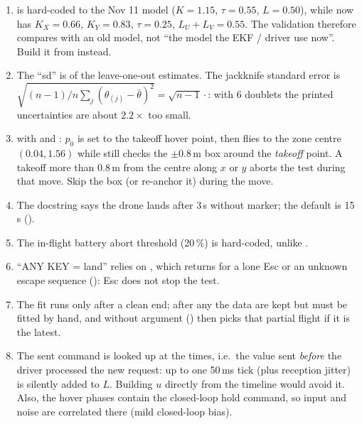 \begin{review}
\begin{enumerate}[leftmargin=*,itemsep=2pt]
\item {}  is hard-coded to the Nov 11 model ($K=1.15$, $\tau=0.55$,
$L=0.50$), while  now has $K_X=0.66$, $K_Y=0.83$, $\tau=0.25$, $L_U+L_V=0.55$. The
validation therefore compares with an old model, not ``the model the EKF / driver use now''. Build it from
 instead.
\item {} The ``sd'' is  of the leave-one-out estimates. The jackknife
standard error is $\sqrt{(n-1)/n\sum_j(\theta_{(j)}-\bar\theta)^2} = \sqrt{n-1}\cdot$: with 6 doublets
the printed uncertainties are about $2.2\times$ too small.
\item {} with  and : $p_0$ is set to the takeoff hover point, then
 flies to the zone centre $(0.04, 1.56)$ while  still checks the $\pm0.8$\,m box
around the \emph{takeoff} point. A takeoff more than 0.8\,m from the centre along $x$ or $y$ aborts the test during
that move. Skip the box (or re-anchor it) during the move.
\item {} The docstring says the drone lands after 3\,s without marker; the default
 is 15\,s ().
\item {} The in-flight battery abort threshold (20\,\%) is hard-coded, unlike
.
\item {} ``ANY KEY = land'' relies on , which returns  for a lone
Esc or an unknown escape sequence (): Esc does not stop the test.
\item {} The fit runs only after a clean end; after any  the data are kept but must
be fitted by hand, and  without argument () then picks that partial
flight if it is the latest.
\item {} The sent command is looked up at the  times, i.e.\ the value sent
\emph{before} the driver processed the new request: up to one 50\,ms tick (plus reception jitter) is silently
added to $L$. Building $u$ directly from the  timeline would avoid it. Also, the hover phases contain
the closed-loop hold command, so input and noise are correlated there (mild closed-loop bias).

\end{enumerate}
\end{review}
